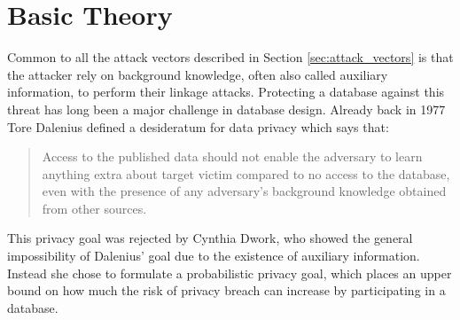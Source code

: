 
\chapter{Basic Theory} \label{ch:Basic Theory}

Common to all the attack vectors described in Section \ref{sec:attack_vectors} is that the attacker rely on background knowledge, often also called auxiliary information, to perform their linkage attacks. Protecting a database against this threat has long been a major challenge in database design. Already back in 1977 Tore Dalenius \citep{dalenius1977towards} defined a desideratum for data privacy which says that: \begin{quote}
	Access to the published data should not enable the adversary to learn anything extra about target victim compared to no access to the database, even with the presence of any adversary’s background knowledge obtained from other sources.
\end{quote} 

This privacy goal was rejected by Cynthia Dwork, who showed the general impossibility of Dalenius' goal due to the existence of auxiliary information. Instead she chose to formulate a probabilistic privacy goal, which places an upper bound on how much the risk of privacy breach can increase by participating in a database.

%

